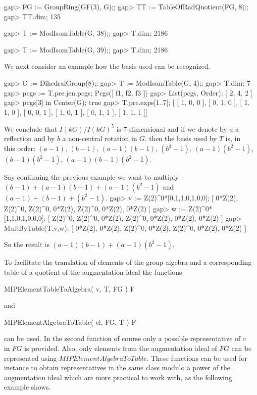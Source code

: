 gap> FG := GroupRing(GF(3), G);;
gap> TT := TableOfRadQuotient(FG, 8);;
gap> TT.dim;
135

gap> T := ModIsomTable(G, 38);;
gap> T.dim;
2186

gap> T := ModIsomTable(G, 39);;
gap> T.dim;
2186
\endexample

We next consider an example how the basis used can be recognized.

\beginexample
gap> G := DihedralGroup(8);;
gap> T := ModIsomTable(G, 4);;
gap> T.dim;
7
gap> pcgs := T.pre.jen.pcgs;
Pcgs([ f1, f2, f3 ])
gap> List(pcgs, Order);
[ 2, 4, 2 ]
gap> pcgs[3] in Center(G);
true
gap> T.pre.exps{[1..7]};
[ [ 1, 0, 0 ], [ 0, 1, 0 ], [ 1, 1, 0 ], [ 0, 0, 1 ], [ 1, 0, 1 ], [ 0, 1, 1 ], 
  [ 1, 1, 1 ]] 
\endexample

We conclude that $I(kG)/I(kG)^5$ is $7$-dimensional and if we denote by
  $a$ a reflection and by $b$ a non-central rotation in $G$, then the
  basis used by $T$ is, in this order: $(a-1)$, $(b-1)$, $(a-1)(b-1)$, $(b^2-1)$,
   $(a-1)(b^2-1)$, $(b-1)(b^2-1)$, $(a-1)(b-1)(b^2-1)$.    
\medskip

 Say continuing the previous example we want to multiply $(b-1)+(a-1)(b-1)+(a-1)(b^2-1)$ and $(a-1)+(b-1)+(b^2-1)$.
\beginexample
gap> v := Z(2)^0*[0,1,1,0,1,0,0];
[ 0*Z(2), Z(2)^0, Z(2)^0, 0*Z(2), Z(2)^0, 0*Z(2), 0*Z(2) ]
gap> w := Z(2)^0*[1,1,0,1,0,0,0];
[ Z(2)^0, Z(2)^0, 0*Z(2), Z(2)^0, 0*Z(2), 0*Z(2), 0*Z(2) ]
gap> MultByTable(T,v,w);
[ 0*Z(2), 0*Z(2), Z(2)^0, 0*Z(2), Z(2)^0, 0*Z(2), 0*Z(2) ]
\endexample

So the result is $(a-1)(b-1) + (a-1)(b^2-1)$.
\medskip

To facilitate the translation of elements of the group algebra
and a corresponding table of a quotient of the augmentation ideal 
the functions

\> MIPElementTableToAlgebra( v, T, FG ) F

and

\> MIPElementAlgebraToTable( el, FG, T ) F 

can be used. In the second function of course only a possible
representative of $v$ in $FG$ is provided. Also, only elements 
from the augmentation ideal of $FG$ can be represented using
$MIPElementAlgebraToTable$. These functions can be used for 
instance to obtain representatives in the same class modulo
a power of the augmentation ideal which are more practical to
work with, as the following example shows.

